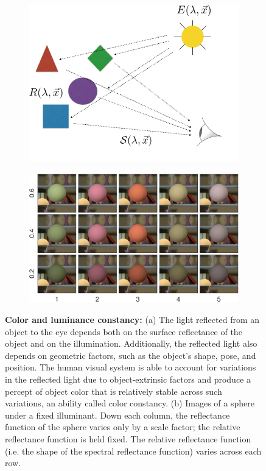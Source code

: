 \documentclass{jov}
\begin{document}
\begin{figure}
\centering
\begin{subfigure}{0.4 \textwidth}
	\centering
	\caption{}
        \includegraphics[width=\textwidth]{../FiguresDraft4/Figure1/Figure1_a.png}
        \label{fig:introSchematic}
    \end{subfigure}
    \begin{subfigure}{0.55 \textwidth}   
        \caption{}    
        \includegraphics[width=\textwidth]{../FiguresDraft4/Figure1/Figure1_b.pdf}
        \label{fig:introExampleFigure}
    \end{subfigure}
    \label{introFigure}
    \caption{{\bf Color and luminance constancy:} (a)  The light reflected from an object to the eye depends both on the surface reflectance of the object and on the illumination. Additionally, the reflected light also depends on geometric factors, such as the object's shape, pose, and position. The human visual system is able to account for variations in the reflected light due to object-extrinsic factors and produce a percept of object color that is relatively stable across such variations, an ability called color constancy. (b) Images of a sphere under a fixed illuminant.  Down each column, the reflectance function of the sphere varies only by a scale factor; the relative reflectance function is held fixed.  The relative reflectance function (i.e. the shape of the spectral reflectance function) varies across each row.
}
\end{figure}
\end{document}
